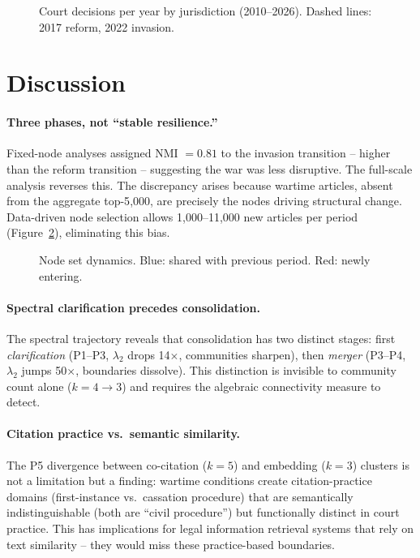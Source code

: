 \documentclass[11pt]{article}
\begin{document}
\begin{figure}[t]
\centering

\caption{Court decisions per year by jurisdiction (2010--2026). Dashed lines: 2017 reform, 2022 invasion.}
\label{fig:volume}
\end{figure}

\section{Discussion}
\label{sec:discussion}

\paragraph{Three phases, not ``stable resilience.''}
Fixed-node analyses assigned NMI $= 0.81$ to the invasion transition -- higher than the reform transition -- suggesting the war was less disruptive.
The full-scale analysis reverses this.
The discrepancy arises because wartime articles, absent from the aggregate top-5{,}000, are precisely the nodes driving structural change.
Data-driven node selection allows 1{,}000--11{,}000 new articles per period (Figure~\ref{fig:node_dynamics}), eliminating this bias.

\begin{figure}[t]
\centering

\caption{Node set dynamics. Blue: shared with previous period. Red: newly entering.}
\label{fig:node_dynamics}
\end{figure}

\paragraph{Spectral clarification precedes consolidation.}
The spectral trajectory reveals that consolidation has two distinct stages: first \emph{clarification} (P1--P3, $\lambda_2$ drops 14$\times$, communities sharpen), then \emph{merger} (P3--P4, $\lambda_2$ jumps 50$\times$, boundaries dissolve).
This distinction is invisible to community count alone ($k = 4 \to 3$) and requires the algebraic connectivity measure to detect.

\paragraph{Citation practice vs.\ semantic similarity.}
The P5 divergence between co-citation ($k=5$) and embedding ($k=3$) clusters is not a limitation but a finding: wartime conditions create citation-practice domains (first-instance vs.\ cassation procedure) that are semantically indistinguishable (both are ``civil procedure'') but functionally distinct in court practice.
This has implications for legal information retrieval systems that rely on text similarity -- they would miss these practice-based boundaries.
\end{document}
